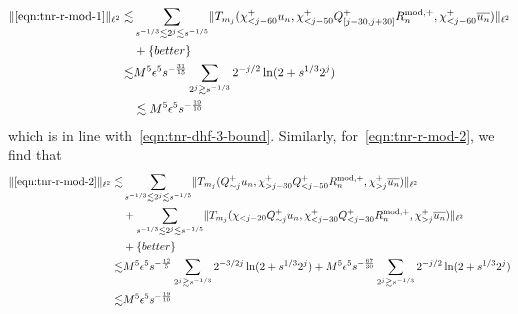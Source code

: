 \documentclass[letterpaper, reqno,final]{amsart}
\newcommand{\btext}[1]{\left\{\textup{#1}\right\}}
\newcommand{\bbetter}{\btext{better}}
\begin{document}
\begin{equation*}\begin{split}
    \lVert \eqref{eqn:tnr-r-mod-1} \rVert_{\ell^2} \lesssim& \sum_{s^{-1/3} \lesssim 2^j \lesssim s^{-1/5}} \lVert T_{m_j}(\chi_{< j - 60}^+ u_n, \chi_{< j - 50}^+Q_{[j-30, j+30]}^+ R_n^{\text{mod},+}, \chi_{< j - 60}^+ \overline{u_n}) \rVert_{\ell^2}\\
    &+\bbetter\\
    \lesssim& M^5\epsilon^5 s^{-\frac{31}{15}} \sum_{2^j \gtrsim s^{-1/3}} 2^{-j/2} \ln(2 + s^{1/3} 2^{j})\\
    &\lesssim M^5 \epsilon^5 s^{-\frac{19}{10}}
\end{split}
\end{equation*}
which is in line with~\eqref{eqn:tnr-dhf-3-bound}.  Similarly, for~\eqref{eqn:tnr-r-mod-2}, we find that
\begin{equation*}\begin{split}
    \lVert \eqref{eqn:tnr-r-mod-2} \rVert_{\ell^2} \lesssim& \sum_{s^{-1/3} \lesssim 2^j \lesssim s^{-1/5}} \lVert T_{m_j}(Q_{\sim j}^+ u_n, \chi_{> j - 30}^+Q_{< j - 50}^+ R_n^{\text{mod},+}, \chi_{> j}^+\overline{u_n}) \rVert_{\ell^2}\\
    &+ \sum_{s^{-1/3} \lesssim 2^j \lesssim s^{-1/5}} \lVert T_{m_j}(\chi_{< j - 20} Q_{\sim j}^+ u_n, \chi_{< j - 30}^+Q_{< j - 30}^+ R_n^{\text{mod},+}, \chi_{> j}^+\overline{u_n}) \rVert_{\ell^2}\\
    &+\bbetter\\
    \lesssim& M^5\epsilon^5 s^{-\frac{12}{5}} \sum_{2^j \gtrsim s^{-1/3}} 2^{-3/2j} \ln(2 + s^{1/3} 2^{j}) + M^5\epsilon^5 s^{-\frac{67}{30}} \sum_{2^j \gtrsim s^{-1/3}} 2^{-j/2} \ln(2 + s^{1/3} 2^{j})\\
    \lesssim& M^5 \epsilon^5 s^{-\frac{19}{10}}
\end{split}
\end{equation*}
\end{document}
